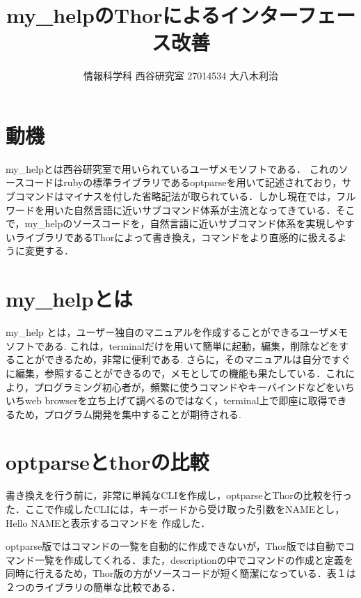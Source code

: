 \documentclass[a4j,twocolumn]{jsarticle}
\begin{document}
\title{my\_helpのThorによるインターフェース改善}
\author{\hspace{5mm} 情報科学科\hspace{5mm} 西谷研究室 \hspace{5mm} 27014534 \hspace{5mm} 大八木利治}
\date{}
\maketitle
\section{動機}
my\_helpとは西谷研究室で用いられているユーザメモソフトである．
これのソースコードはrubyの標準ライブラリであるoptparseを用いて記述されており，サブコマンドはマイナスを付した省略記法が取られている\cite{opt1}．しかし現在では，フルワードを用いた自然言語に近いサブコマンド体系が主流となってきている．そこで，my\_helpのソースコードを，自然言語に近いサブコマンド体系を実現しやすいライブラリであるThorによって書き換え，コマンドをより直感的に扱えるように変更する\cite{koichiro}．

\section{my\_helpとは}

my\_help とは，ユーザー独自のマニュアルを作成することができるユーザメモソフトである.
これは，terminalだけを用いて簡単に起動，編集，削除などをすることができるため，非常に便利である.
さらに，そのマニュアルは自分ですぐに編集，参照することができるので，メモとしての機能も果たしている．これにより，プログラミング初心者が，頻繁に使うコマンドやキーバインドなどをいちいちweb browserを立ち上げて調べるのではなく，terminal上で即座に取得できるため，プログラム開発を集中することが期待される.


\section{optparseとthorの比較}
書き換えを行う前に，非常に単純なCLIを作成し，optparseとThorの比較を行った．ここで作成したCLIには，キーボードから受け取った引数をNAMEとし，Hello NAMEと表示するコマンドを
作成した．

optparse版ではコマンドの一覧を自動的に作成できないが，Thor版では自動でコマンド一覧を作成してくれる．また，descriptionの中でコマンドの作成と定義を同時に行えるため，Thor版の方がソースコードが短く簡潔になっている．表１は２つのライブラリの簡単な比較である．
\end{document}
